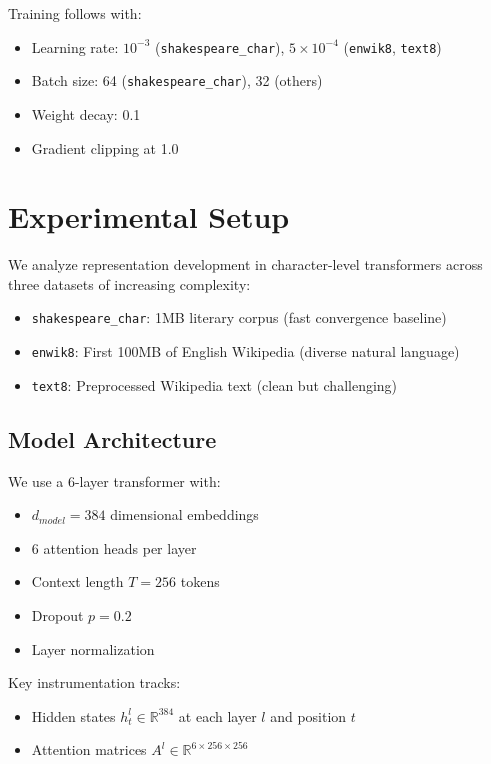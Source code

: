 \documentclass{article} %
\begin{document}
Training follows \citep{loshchilov2017adamw} with:
\begin{itemize}
    \item Learning rate: $10^{-3}$ (\texttt{shakespeare\_char}), $5\times10^{-4}$ (\texttt{enwik8}, \texttt{text8})
    \item Batch size: 64 (\texttt{shakespeare\_char}), 32 (others)
    \item Weight decay: 0.1
    \item Gradient clipping at 1.0
\end{itemize}

\section{Experimental Setup}
\label{sec:experimental}

We analyze representation development in character-level transformers across three datasets of increasing complexity:
\begin{itemize}
    \item \texttt{shakespeare\_char}: 1MB literary corpus (fast convergence baseline)
    \item \texttt{enwik8}: First 100MB of English Wikipedia (diverse natural language)
    \item \texttt{text8}: Preprocessed Wikipedia text (clean but challenging)
\end{itemize}

\subsection{Model Architecture}
We use a 6-layer transformer with:
\begin{itemize}
    \item $d_{model}=384$ dimensional embeddings
    \item 6 attention heads per layer
    \item Context length $T=256$ tokens
    \item Dropout $p=0.2$
    \item Layer normalization \citep{ba2016layer}
\end{itemize}

Key instrumentation tracks:
\begin{itemize}
    \item Hidden states $h^l_t \in \mathbb{R}^{384}$ at each layer $l$ and position $t$
    \item Attention matrices $A^l \in \mathbb{R}^{6 \times 256 \times 256}$
\end{itemize}
\end{document}
